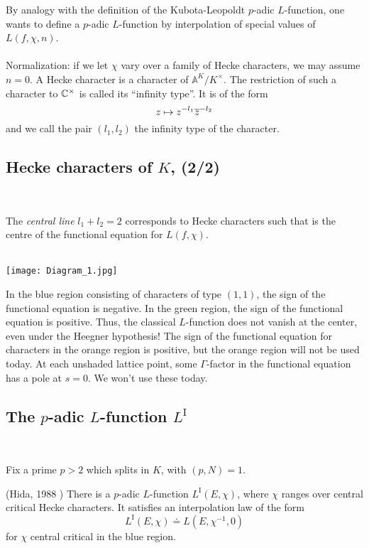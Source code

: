 \documentclass[12pt,amsfont]{amsart}
\begin{document}
By analogy with the definition of the Kubota-Leopoldt $p$-adic $L$-function, one wants to define a $p$-adic $L$-function by interpolation of special values of $L(f, \chi, n)$. \\ \\
Normalization: if we let $\chi$ vary over a family of Hecke characters, we may assume $n = 0$. A Hecke character is a character of $\mathbb{A}^K/K^\times$. The restriction of such a character to ${\mathbb C}^\times$ is called its ``infinity type''. It is of the form
\[z \mapsto z^{-l_1} \overline{z}^{-l_2} \]
and we call the pair $(l_1, l_2)$ the infinity type of the character.
\subsection{Hecke characters of $K$, (2/2)} 
{\ }

The \emph{central line} $l_1 + l_2 = 2$ corresponds to Hecke characters such that is the centre of the functional equation for $L(f,\chi)$. \\ \\
{\begin{center}  \texttt{[image: Diagram\_1.jpg]}
\end{center}}

In the blue region consisting of characters of type $(1,1)$, the sign of the functional equation is negative. In the green region, the sign of the functional equation is positive. Thus, the classical $L$-function does not vanish at the center, even under the Heegner hypothesis! The sign of the functional equation for characters in the orange region is positive, but the orange region will not be used today. At each unshaded lattice point, some $\Gamma$-factor in the functional equation has a pole at $s = 0$. We won't use these today. 

\subsection{The $p$-adic $L$-function $L^{\text{I}}$}
{\ }

Fix a prime $p > 2$ which splits in $K$, with $(p,N) = 1$. 

\begin{thm} (Hida, 1988 ) There is a $p$-adic $L$-function $L^{\text{I}}(E, \chi)$, where $\chi$ ranges over central critical Hecke characters. It satisfies an interpolation law of the form
\[L^{\text{I}}(E, \chi) \doteq L(E, \chi^{-1}, 0) \]
for $\chi$ central critical in the blue region. 
\end{thm}
\end{document}

